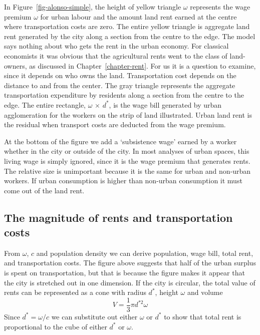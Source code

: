 In Figure~\ref{fig-alonso-simple}, the height of yellow triangle $\omega$ represents the wage premium $\omega$ for urban labour and the amount land rent earned at the centre %
where transportation costs are zero. The entire yellow triangle is aggregate land rent generated by the city along a section from the centre to the edge. 
The model says nothing about who gets the rent in the urban economy. 
For classical economists it was obvious that the agricultural rents went to the class of land-owners, as discussed in Chapter~\ref{chapter-rent}. 
For us it is a question to examine, since it depends on who owns the land.  Transportation cost depends on the distance  to and from the center.  
The gray triangle represents the aggregate transportation expenditure by residents along a section from the centre to the edge. 
The entire rectangle, $\omega$ $\times$ $d^*$, is the wage bill generated by urban agglomeration for the workers on the strip of land illustrated. Urban land rent is the residual when transport costs are deducted from the wage premium. %

At the bottom of the figure we add a `subsistence wage'  earned by a worker whether in the city or outside of the city. In most analyses of urban spaces, this living wage is simply ignored, since it is the wage premium that generates rents.  The relative size is unimportant because it is the same for urban and non-urban workers. If urban consumption is higher than non-urban consumption it must come out of the land rent.


 \subsection{The magnitude of rents and transportation costs}
 From $\omega$, $c$ and population density we can derive population, wage bill, total rent, and transportation costs. The figure above suggests that  half of the urban surplus is spent on transportation, but that is because the figure makes it appear that the city is stretched out in one dimension. If  the city is circular, the total value of rents can be represented as  a cone with radius $d^*$, height $\omega$ and volume  \[ V=\frac{1}{3}\pi  d^{*2} \omega \]
Since $d^*=\omega/c$ we can substitute out either  $\omega$ or  $d^*$ to show that total rent is  proportional to the cube of either  $d^*$ or $\omega$. 

